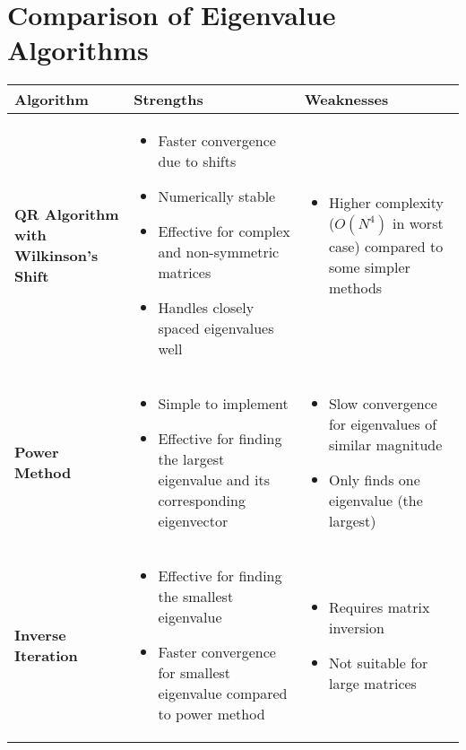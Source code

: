 \documentclass[journal]{IEEEtran}
\begin{document}
\section{Comparison of Eigenvalue Algorithms}
\centering
\begin{tabular}{|p{3cm}|p{4cm}|p{4cm}|}
\hline
\textbf{Algorithm} & \textbf{Strengths} & \textbf{Weaknesses} \\
\hline
\textbf{QR Algorithm with Wilkinson's Shift} & \begin{itemize}[left=2pt]
    \item Faster convergence due to shifts
    \item Numerically stable
    \item Effective for complex and non-symmetric matrices
    \item Handles closely spaced eigenvalues well
    \end{itemize} & \begin{itemize}[left=2pt]
    \item Higher complexity (\(O(N^4)\) in worst case) compared to some simpler methods
    \end{itemize} \\
\hline
\textbf{Power Method} & \begin{itemize}[left=2pt]
    \item Simple to implement
    \item Effective for finding the largest eigenvalue and its corresponding eigenvector
    \end{itemize} & \begin{itemize}[left=2pt]
    \item Slow convergence for eigenvalues of similar magnitude
    \item Only finds one eigenvalue (the largest)
    \end{itemize} \\
\hline
\textbf{Inverse Iteration} & \begin{itemize}[left=2pt]
    \item Effective for finding the smallest eigenvalue
    \item Faster convergence for smallest eigenvalue compared to power method
    \end{itemize} & \begin{itemize}[left=2pt]
    \item Requires matrix inversion
    \item Not suitable for large matrices
    \end{itemize} \\

\end{tabular}
\end{document}
